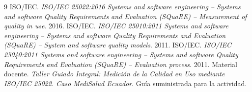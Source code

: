 \documentclass[11pt,letterpaper]{article}
\begin{document}

\tableofcontents
\clearpage
{}








\begin{thebibliography}{9}
 ISO/IEC. \textit{ISO/IEC 25022:2016 Systems and software engineering -- Systems and software Quality Requirements and Evaluation (SQuaRE) -- Measurement of quality in use}. 2016.
 ISO/IEC. \textit{ISO/IEC 25010:2011 Systems and software engineering -- Systems and software Quality Requirements and Evaluation (SQuaRE) -- System and software quality models}. 2011.
 ISO/IEC. \textit{ISO/IEC 25040:2011 Systems and software engineering -- Systems and software Quality Requirements and Evaluation (SQuaRE) -- Evaluation process}. 2011.
 Material docente. \textit{Taller Guiado Integral: Medición de la Calidad en Uso mediante ISO/IEC 25022. Caso MediSalud Ecuador}. Guía suministrada para la actividad.
\end{thebibliography}

\appendix

\end{document}
